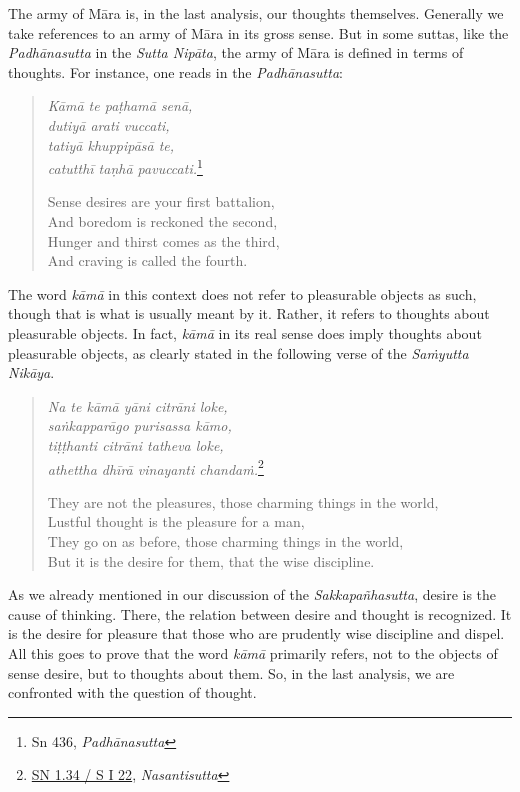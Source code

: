 The army of Māra is, in the last analysis, our thoughts themselves. Generally we take references to an army of Māra in its gross sense. But in some suttas, like the \emph{Padhānasutta} in the \emph{Sutta Nipāta}, the army of Māra is defined in terms of thoughts. For instance, one reads in the \emph{Padhānasutta}:

\begin{quote}
\emph{Kāmā te paṭhamā senā,}\\
\emph{dutiyā arati vuccati,}\\
\emph{tatiyā khuppipāsā te,}\\
\emph{catutthī taṇhā pavuccati.}\footnote{Sn 436, \emph{Padhānasutta}}

Sense desires are your first battalion,\\
And boredom is reckoned the second,\\
Hunger and thirst comes as the third,\\
And craving is called the fourth.
\end{quote}

The word \emph{kāmā} in this context does not refer to pleasurable objects as such, though that is what is usually meant by it. Rather, it refers to thoughts about pleasurable objects. In fact, \emph{kāmā} in its real sense does imply thoughts about pleasurable objects, as clearly stated in the following verse of the \emph{Saṁyutta Nikāya}.

\begin{quote}
\emph{Na te kāmā yāni citrāni loke,}\\
\emph{saṅkapparāgo purisassa kāmo,}\\
\emph{tiṭṭhanti citrāni tatheva loke,}\\
\emph{athettha dhīrā vinayanti chandaṁ.}\footnote{\href{https://suttacentral.net/sn1.34/pli/ms}{SN 1.34 / S I 22}, \emph{Nasantisutta}}

They are not the pleasures, those charming things in the world,\\
Lustful thought is the pleasure for a man,\\
They go on as before, those charming things in the world,\\
But it is the desire for them, that the wise discipline.
\end{quote}

As we already mentioned in our discussion of the \emph{Sakkapañhasutta}, desire is the cause of thinking. There, the relation between desire and thought is recognized. It is the desire for pleasure that those who are prudently wise discipline and dispel. All this goes to prove that the word \emph{kāmā} primarily refers, not to the objects of sense desire, but to thoughts about them. So, in the last analysis, we are confronted with the question of thought.

